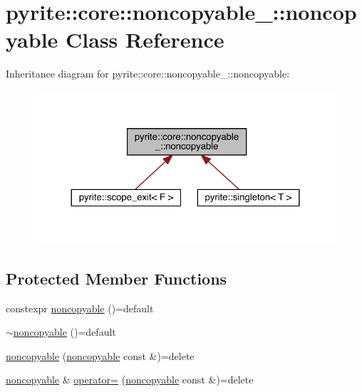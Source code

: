 \hypertarget{classpyrite_1_1core_1_1noncopyable___1_1noncopyable}{}\section{pyrite\+:\+:core\+:\+:noncopyable\+\_\+\+:\+:noncopyable Class Reference}
\label{classpyrite_1_1core_1_1noncopyable___1_1noncopyable}


Inheritance diagram for pyrite\+:\+:core\+:\+:noncopyable\+\_\+\+:\+:noncopyable\+:
\nopagebreak
\begin{figure}[H]
\begin{center}
\leavevmode
\includegraphics[width=324pt]{df/d64/classpyrite_1_1core_1_1noncopyable___1_1noncopyable__inherit__graph}
\end{center}
\end{figure}
\subsection*{Protected Member Functions}
\begin{DoxyCompactItemize}
\item 
constexpr \mbox{\hyperlink{classpyrite_1_1core_1_1noncopyable___1_1noncopyable_a4a81c76fa6f35c99c55206d61225b34d}{noncopyable}} ()=default
\item 
\mbox{\hyperlink{classpyrite_1_1core_1_1noncopyable___1_1noncopyable_a4c38a4adec1bfca43cbfe5c90c3ee46c}{$\sim$noncopyable}} ()=default
\item 
\mbox{\hyperlink{classpyrite_1_1core_1_1noncopyable___1_1noncopyable_af2fd68ae3feae618e80a6fa92146a962}{noncopyable}} (\mbox{\hyperlink{classpyrite_1_1core_1_1noncopyable___1_1noncopyable}{noncopyable}} const \&)=delete
\item 
\mbox{\hyperlink{classpyrite_1_1core_1_1noncopyable___1_1noncopyable}{noncopyable}} \& \mbox{\hyperlink{classpyrite_1_1core_1_1noncopyable___1_1noncopyable_a6c535716da364f40a0003d85c60d4261}{operator=}} (\mbox{\hyperlink{classpyrite_1_1core_1_1noncopyable___1_1noncopyable}{noncopyable}} const \&)=delete
\end{DoxyCompactItemize}


